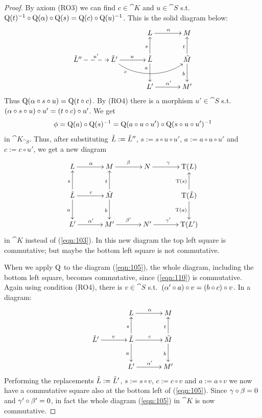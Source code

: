 \begin{proof}
By axiom (RO3) we can find $c \in \cat{K}$ and $u \in \cat{S}$ s.t.\ 
$\operatorname{Q}(t)^{-1} \circ \operatorname{Q}(\alpha) \circ \operatorname{Q}(s) = \operatorname{Q}(c) \circ 
\operatorname{Q}(u)^{-1}$.
This is the solid diagram below:
\[ \UseTips \xymatrix @C=8ex @R5.5ex { 
& &
L 
\ar[r]^{\al}
&
M
\\
\til{L}''
\ar@{-->}[r]^{u'}
&
\til{L}'
\ar[r]^{u}
\ar@(dr,dl)[rr]_(0.2){c}
&
\til{L} 
\ar[d]_(0.3){a}
\ar[u]^{s}
&
\til{M}
\ar[d]_{b}
\ar[u]^{t}
\\
& &
L' 
\ar[r]^{\al'}
&
M'
} \]
Thus 
$\operatorname{Q}(\alpha \circ s \circ u) = \operatorname{Q}(t \circ c)$.
By (RO4) there is a morphism $u' \in \cat{S}$ s.t.\ 
$(\alpha \circ s \circ u) \circ u' = (t \circ c) \circ u'$.
We get
\[ \phi = \operatorname{Q}(a) \circ \operatorname{Q}(s)^{-1} = \operatorname{Q}(a \circ u \circ u') \circ 
\operatorname{Q}(s \circ 
u \circ u')^{-1} \]
in $\cat{K}_{\cat{S}}$. 
Thus, after substituting $\tilde{L} :=  \tilde{L}''$,
 $s := s \circ u \circ u'$,
$a := a \circ u \circ u'$
and $c := c \circ u'$, we get a new diagram
\begin{equation} \label{eqn:105}
\UseTips \xymatrix @C=8ex @R=5.5ex { 
L 
\ar[r]^{\al}
&
M
\ar[r]^{\be}
& 
N
\ar[r]^{\ga}
&
\opn{T}(L)
\\
\til{L} 
\ar[r]^{c}
\ar[d]_{a}
\ar[u]^{s}
&
\til{M}
\ar[d]_{b}
\ar[u]^{t}
& 
&
\opn{T}(\til{L})
\ar[d]_{\opn{T}(a)}
\ar[u]^{\opn{T}(s)}
\\
L' 
\ar[r]^{\al'}
&
M'
\ar[r]^{\be'}
& 
N'
\ar[r]^{\ga'}
&
\opn{T}(L') 
} 
\end{equation}
in $\cat{K}$ instead of (\ref{eqn:103}). In this new diagram the top left 
square is commutative; but maybe the bottom left square is not commutative. 

When we apply $\operatorname{Q}$ to the diagram (\ref{eqn:105}), the  whole diagram, 
including the bottom left square, becomes commutative, since (\ref{eqn:110}) is
commutative. Again using condition (RO4), there is 
$v \in \cat{S}$ s.t.\ 
$(\alpha' \circ a) \circ v = (b \circ c) \circ v$.
In a diagram:
\[ \UseTips \xymatrix @C=8ex @R=5.5ex { 
& 
L 
\ar[r]^{\al}
&
M
\\
\til{L}'
\ar[r]^{v}
&
\til{L} 
\ar[d]_{a}
\ar[u]^{s}
\ar[r]^{c}
&
\til{M}
\ar[d]_{b}
\ar[u]^{t}
\\
& 
L' 
\ar[r]^{\al'}
&
M'
} \]
Performing the replacements
$\tilde{L} :=  \tilde{L}'$,
$s := s \circ v$,
$c := c \circ v$ and 
$a := a \circ v$ we now have a commutative square also at the bottom
left of (\ref{eqn:105}). Since $\gamma \circ \beta = 0$ and 
$\gamma' \circ \beta' = 0$,  
in fact the whole diagram (\ref{eqn:105}) in $\cat{K}$ is now commutative.


\end{proof}
